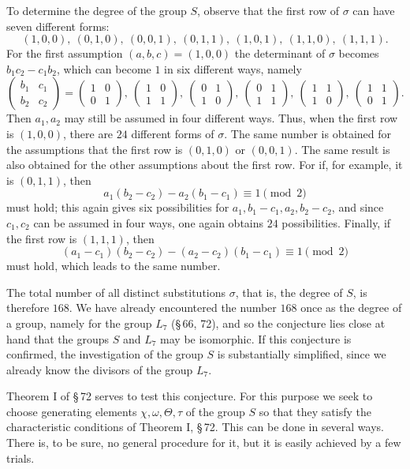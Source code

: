 \documentclass[11pt]{article}
\providecommand{\mat}[4]{\begin{pmatrix}#1&#2\\#3&#4\end{pmatrix}}
\providecommand{\mat}[4]{\begin{pmatrix}#1&#2\\#3&#4\end{pmatrix}}
\begin{document}
To determine the degree of the group $S$, observe that the first row of $\sigma$ can have seven different forms:
\[
 (1,0,0),\ (0,1,0),\ (0,0,1),\ (0,1,1),\ (1,0,1),\ (1,1,0),\ (1,1,1).
\]
For the first assumption $(a,b,c)=(1,0,0)$ the determinant of $\sigma$ becomes $b_1c_2-c_1b_2$, which can become $1$ in six different ways, namely
\[
 \mat{b_1}{c_1}{b_2}{c_2}=\mat{1}{0}{0}{1},\ \mat{1}{0}{1}{1},\ \mat{0}{1}{1}{0},\ \mat{0}{1}{1}{1},\ \mat{1}{1}{1}{0},\ \mat{1}{1}{0}{1}.
\]
Then $a_1,a_2$ may still be assumed in four different ways. Thus, when the first row is $(1,0,0)$, there are $24$ different forms of $\sigma$. The same number is obtained for the assumptions that the first row is $(0,1,0)$ or $(0,0,1)$. The same result is also obtained for the other assumptions about the first row. For if, for example, it is $(0,1,1)$, then
\[
 a_1(b_2-c_2)-a_2(b_1-c_1)\equiv 1\pmod 2
\]
must hold; this again gives six possibilities for $a_1,b_1-c_1,a_2,b_2-c_2$, and since $c_1,c_2$ can be assumed in four ways, one again obtains $24$ possibilities. Finally, if the first row is $(1,1,1)$, then
\[
 (a_1-c_1)(b_2-c_2)-(a_2-c_2)(b_1-c_1)\equiv 1\pmod 2
\]
must hold, which leads to the same number.

The total number of all distinct substitutions $\sigma$, that is, the degree of $S$, is therefore $168$. We have already encountered the number $168$ once as the degree of a group, namely for the group $L_7$ (\S\,66, 72), and so the conjecture lies close at hand that the groups $S$ and $L_7$ may be isomorphic. If this conjecture is confirmed, the investigation of the group $S$ is substantially simplified, since we already know the divisors of the group $L_7$.

Theorem I of \S\,72 serves to test this conjecture. For this purpose we seek to choose generating elements $\chi,\omega,\Theta,\tau$ of the group $S$ so that they satisfy the characteristic conditions of Theorem I, \S\,72. This can be done in several ways. There is, to be sure, no general procedure for it, but it is easily achieved by a few trials.
\end{document}

